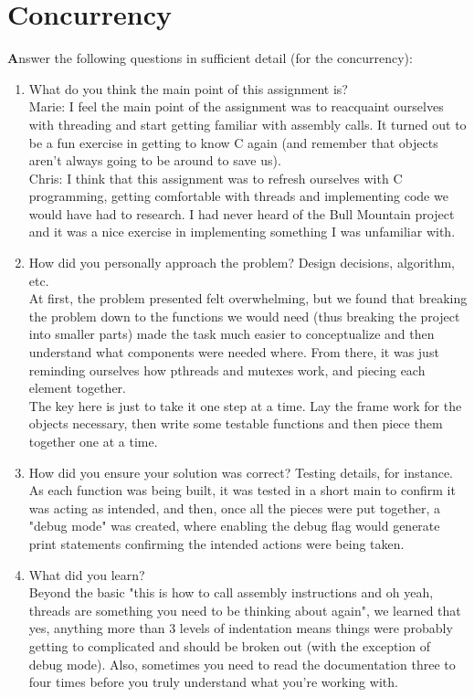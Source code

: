 \documentclass[letterpaper,10pt,titlepage]{article}
\begin{document}
\section{Concurrency}
\textbf Answer the following questions in sufficient detail (for the concurrency): 
\begin{enumerate}
\item What do you think the main point of this assignment is?\\
Marie: I feel the main point of the assignment was to reacquaint ourselves with threading and start getting familiar with assembly calls. It turned out to be a fun exercise in getting to know C again (and remember that objects aren't always going to be around to save us).\\
Chris: I think that this assignment was to refresh ourselves with C programming, getting comfortable with threads and implementing code we would have had to research. I had never heard of the Bull Mountain project and it was a nice exercise in implementing something I was unfamiliar with.
\item How did you personally approach the problem? Design decisions, algorithm, etc.\\
At first, the problem presented felt overwhelming, but we found that breaking the problem down to the functions we would need (thus breaking the project into smaller parts) made the task much easier to conceptualize and then understand what components were needed where. From there, it was just reminding ourselves how pthreads and mutexes work, and piecing each element together. \\
The key here is just to take it one step at a time. Lay the frame work for the objects necessary, then write some testable functions and then piece them together one at a time.\\
\item How did you ensure your solution was correct? Testing details, for instance.\\
As each function was being built, it was tested in a short main to confirm it was acting as intended, and then, once all the pieces were put together, a "debug mode" was created, where enabling the debug flag would generate print statements confirming the intended actions were being taken.
\item What did you learn?\\
Beyond the basic "this is how to call assembly instructions and oh yeah, threads are something you need to be thinking about again", we learned that yes, anything more than 3 levels of indentation means things were probably getting to complicated and should be broken out (with the exception of debug mode). Also, sometimes you need to read the documentation three to four times before you truly understand what you're working with.\\

\end{enumerate}
\end{document}
